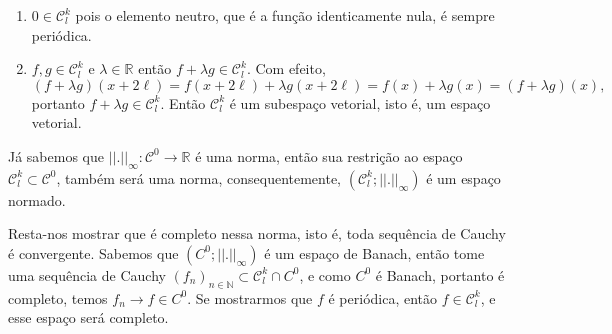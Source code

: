 \documentclass{article}
\begin{document}
\begin{enumerate}
\begin{enumerate}
			\begin{enumerate}
				\item $0 \in \mathcal{C}^{k}_{l}$ pois o elemento neutro, que é a função identicamente nula, é sempre periódica.
				
				\item $f, g \in \mathcal{C}^{k}_{l}$ e $\lambda \in \mathbb{R}$ então $f+\lambda g \in \mathcal{C}^{k}_{l}$. Com efeito, 
				$$
				(f+\lambda g)(x+2\ell) = f(x+2\ell)+\lambda g(x+2\ell) = f(x)+\lambda g(x)=(f+\lambda g)(x),
				$$
 				portanto $f+\lambda g \in  \mathcal{C}^{k}_{l}$. Então $\mathcal{C}^{k}_{l}$ é um subespaço vetorial, isto é, um espaço vetorial. 
				
			\end{enumerate}
			 
			Já sabemos que $||.||_{\infty}:\mathcal{C}^{0} \to \mathbb{R}$ é uma norma, então sua restrição ao espaço $\mathcal{C}^{k}_{l} \subset \mathcal{C}^{0}$, também será uma norma, consequentemente, $(\mathcal{C}^{k}_{l}; ||.||_{\infty})$ é um espaço normado.
			
			Resta-nos mostrar que é completo nessa norma, isto é, toda sequência de Cauchy é convergente. Sabemos que $(C^{0}; ||.||_{\infty})$ é um espaço de Banach, então tome uma sequência de Cauchy $(f_{n})_{n \in \mathbb{N}} \subset \mathcal{C}^{k}_{l} \cap C^{0}$, e como $C^{0}$ é Banach, portanto é completo, temos $f_{n} \to f \in C^{0}$. Se mostrarmos que $f$ é periódica, então $f \in \mathcal{C}^{k}_{l}$, e esse espaço será completo.
			

\end{enumerate}
\end{enumerate}
\end{document}
